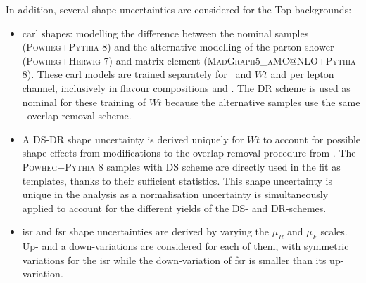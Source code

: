 In addition, several shape uncertainties are considered for the Top backgrounds: 
\begin{itemize}[leftmargin=*]
    \item \gls{carl} shapes: modelling the difference between the nominal samples (\textsc{Powheg}+\textsc{Pythia} 8) and the alternative modelling of the parton shower (\textsc{Powheg}+\textsc{Herwig} 7) and matrix element (\textsc{MadGraph5\_aMC@NLO}+\textsc{Pythia} 8). These \gls{carl} models are trained separately for \ttb\ and $Wt$ and per lepton channel, inclusively in flavour compositions and \nj. The DR scheme is used as nominal for these training of $Wt$ because the alternative samples use the same \ttb\ overlap removal scheme. 
    \item A DS-DR shape uncertainty is derived uniquely for $Wt$ to account for possible shape effects from modifications to the overlap removal procedure from \ttb. The \textsc{Powheg}+\textsc{Pythia} 8 samples with DS scheme are directly used in the fit as templates, thanks to their sufficient statistics. This shape uncertainty is unique in the analysis as a normalisation uncertainty is simultaneously applied to account for the different yields of the DS- and DR-schemes.
    \item \gls{isr} and \gls{fsr} shape uncertainties are derived by varying the $\mu_R$ and $\mu_F$ scales. Up- and a down-variations are considered for each of them, with symmetric variations for the \gls{isr} while the down-variation of \gls{fsr} is smaller than its up-variation.
\end{itemize} 


